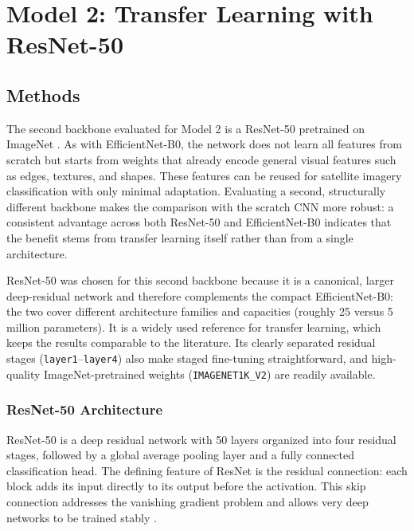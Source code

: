 \section{Model 2: Transfer Learning with ResNet-50}
\label{sec:model2}

\subsection{Methods}

The second backbone evaluated for Model 2 is a ResNet-50 pretrained on ImageNet
\cite{he2016resnet}. As with EfficientNet-B0, the network does not learn all
features from scratch but starts from weights that already encode general visual
features such as edges, textures, and shapes. These features can be reused for
satellite imagery classification with only minimal adaptation. Evaluating a
second, structurally different backbone makes the comparison with the scratch CNN
more robust: a consistent advantage across both ResNet-50 and EfficientNet-B0
indicates that the benefit stems from transfer learning itself rather than from a
single architecture.

ResNet-50 was chosen for this second backbone because it is a canonical, larger
deep-residual network and therefore complements the compact EfficientNet-B0: the
two cover different architecture families and capacities (roughly 25 versus 5
million parameters). It is a widely used reference for transfer learning, which
keeps the results comparable to the literature. Its clearly separated residual
stages (\texttt{layer1}--\texttt{layer4}) also make staged fine-tuning
straightforward, and high-quality ImageNet-pretrained weights
(\texttt{IMAGENET1K\_V2}) are readily available.

\subsubsection{ResNet-50 Architecture}

ResNet-50 is a deep residual network with 50 layers organized into four residual
stages, followed by a global average pooling layer and a fully connected
classification head. The defining feature of ResNet is the residual connection:
each block adds its input directly to its output before the activation. This
skip connection addresses the vanishing gradient problem and allows very deep
networks to be trained stably \cite{he2016resnet}.

